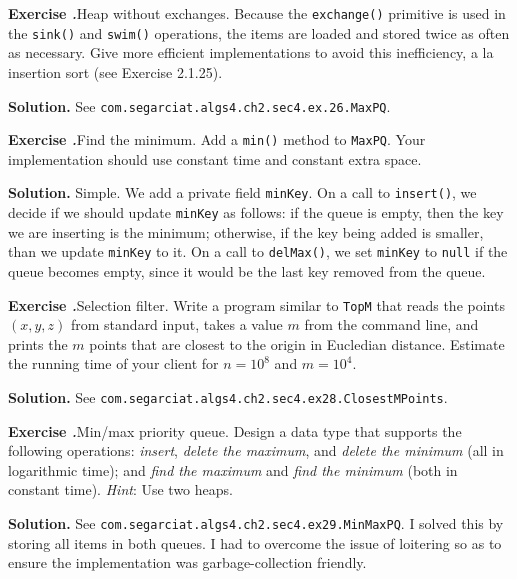 \documentclass[12pt, a4paper]{article}
\newenvironment{ex}[2][Exercise]
{\par\medskip\noindent \textbf{#1 #2.}}
{\medskip}
\newenvironment{sol}[1][Solution]
{\par\medskip\noindent \textbf{#1.} }
{\medskip}
\begin{document}
	\begin{ex}{26}
		\emph{Heap without exchanges}. Because the \texttt{exchange()} primitive is used
		in the \texttt{sink()} and \texttt{swim()} operations, the items are loaded
		and stored twice as often as necessary. Give more efficient implementations
		to avoid this inefficiency, a la insertion sort (see Exercise 2.1.25).
	\end{ex}
	\begin{sol}
		See \texttt{com.segarciat.algs4.ch2.sec4.ex.26.MaxPQ}.
	\end{sol}
	\begin{ex}{27}
		\emph{Find the minimum}. Add a \texttt{min()} method to \texttt{MaxPQ}. Your
		implementation should use constant time and constant extra space.
	\end{ex}
	\begin{sol}
		Simple. We add a private field \texttt{minKey}. On a call to \texttt{insert()},
		we decide if we should update \texttt{minKey} as follows: if the queue
		is empty, then the key we are inserting is the minimum; otherwise, if
		the key being added is smaller, than we update \texttt{minKey} to it.
		On a call to \texttt{delMax()}, we set \texttt{minKey} to \texttt{null}
		if the queue becomes empty, since it would be the last key removed
		from the queue.
	\end{sol}
	\begin{ex}{28}
		\emph{Selection filter}. Write a program similar to \texttt{TopM} that
		reads the points $(x, y, z)$ from standard input, takes a value $m$ from
		the command line, and prints the $m$ points that are closest to the
		origin in Eucledian distance. Estimate the running time of your client
		for $n=10^8$ and $m=10^4$.
	\end{ex}
	\begin{sol}	
		See \texttt{com.segarciat.algs4.ch2.sec4.ex28.ClosestMPoints}.
	\end{sol}
	\begin{ex}{29}
		\emph{Min/max priority queue}. Design a data type that supports the following
		operations: \emph{insert}, \emph{delete the maximum}, and \emph{delete the minimum}
		(all in logarithmic time); and \emph{find the maximum} and \emph{find the minimum}
		(both in constant time). \emph{Hint}: Use two heaps.
	\end{ex}
	\begin{sol}
		See \texttt{com.segarciat.algs4.ch2.sec4.ex29.MinMaxPQ}. I solved this by storing
		all items in both queues. I had to overcome the issue of loitering so
		as to ensure the implementation was garbage-collection friendly.
	\end{sol}
\end{document}

